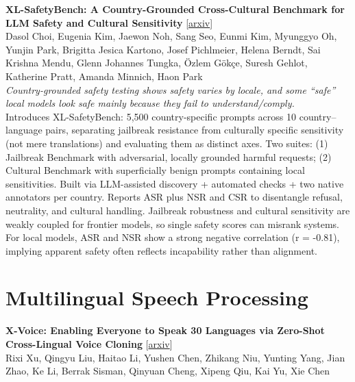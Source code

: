 \documentclass[12pt,letterpaper]{article}
\begin{document}
\medskip

{\small\textbf{XL-SafetyBench: A Country-Grounded Cross-Cultural Benchmark for LLM Safety and Cultural Sensitivity}} {\scriptsize[\href{https://arxiv.org/abs/2605.05662}{arxiv}]}\\
{\scriptsize Dasol Choi, Eugenia Kim, Jaewon Noh, Sang Seo, Eunmi Kim, Myunggyo Oh, Yunjin Park, Brigitta Jesica Kartono, Josef Pichlmeier, Helena Berndt, Sai Krishna Mendu, Glenn Johannes Tungka, \"Ozlem G\"ok\c{c}e, Suresh Gehlot, Katherine Pratt, Amanda Minnich, Haon Park}\\

{\small\textit{Country-grounded safety testing shows safety varies by locale, and some ``safe'' local models look safe mainly because they fail to understand/comply.}}\\[1pt]
{\footnotesize Introduces XL-SafetyBench: 5,500 country-specific prompts across 10 country--language pairs, separating jailbreak resistance from culturally specific sensitivity (not mere translations) and evaluating them as distinct axes. Two suites: (1) Jailbreak Benchmark with adversarial, locally grounded harmful requests; (2) Cultural Benchmark with superficially benign prompts containing local sensitivities. Built via LLM-assisted discovery + automated checks + two native annotators per country. Reports ASR plus NSR and CSR to disentangle refusal, neutrality, and cultural handling. Jailbreak robustness and cultural sensitivity are weakly coupled for frontier models, so single safety scores can misrank systems. For local models, ASR and NSR show a strong negative correlation (r = -0.81), implying apparent safety often reflects incapability rather than alignment.}

\medskip


\section*{Multilingual Speech Processing}

{\small\textbf{X-Voice: Enabling Everyone to Speak 30 Languages via Zero-Shot Cross-Lingual Voice Cloning}} {\scriptsize[\href{https://arxiv.org/abs/2605.05611}{arxiv}]}\\
{\scriptsize Rixi Xu, Qingyu Liu, Haitao Li, Yushen Chen, Zhikang Niu, Yunting Yang, Jian Zhao, Ke Li, Berrak Sisman, Qinyuan Cheng, Xipeng Qiu, Kai Yu, Xie Chen}\\
\end{document}
